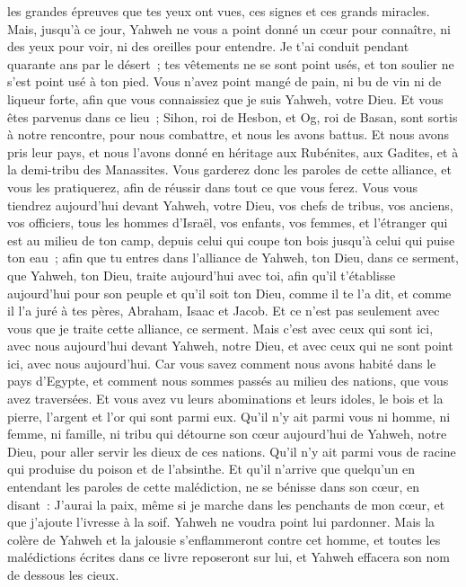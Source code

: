 \begin{multicols}{2}
les grandes épreuves que tes yeux ont vues, ces signes et ces grands miracles.
Mais, jusqu'à ce jour, Yahweh ne vous a point donné un cœur pour connaître, ni des yeux pour voir, ni des oreilles pour entendre.
Je t'ai conduit pendant quarante ans par le désert~; tes vêtements ne se sont point usés, et ton soulier ne s'est point usé à ton pied.
Vous n'avez point mangé de pain, ni bu de vin ni de liqueur forte, afin que vous connaissiez que je suis Yahweh, votre Dieu.
Et vous êtes parvenus dans ce lieu~; Sihon, roi de Hesbon, et Og, roi de Basan, sont sortis à notre rencontre, pour nous combattre, et nous les avons battus.
Et nous avons pris leur pays, et nous l'avons donné en héritage aux Rubénites, aux Gadites, et à la demi-tribu des Manassites.
Vous garderez donc les paroles de cette alliance, et vous les pratiquerez, afin de réussir dans tout ce que vous ferez.
Vous vous tiendrez aujourd'hui devant Yahweh, votre Dieu, vos chefs de tribus, vos anciens, vos officiers, tous les hommes d'Israël,
vos enfants, vos femmes, et l'étranger qui est au milieu de ton camp, depuis celui qui coupe ton bois jusqu'à celui qui puise ton eau~;
afin que tu entres dans l'alliance de Yahweh, ton Dieu, dans ce serment, que Yahweh, ton Dieu, traite aujourd'hui avec toi,
afin qu'il t'établisse aujourd'hui pour son peuple et qu'il soit ton Dieu, comme il te l'a dit, et comme il l'a juré à tes pères, Abraham, Isaac et Jacob.
Et ce n'est pas seulement avec vous que je traite cette alliance, ce serment.
Mais c'est avec ceux qui sont ici, avec nous aujourd'hui devant Yahweh, notre Dieu, et avec ceux qui ne sont point ici, avec nous aujourd'hui.
Car vous savez comment nous avons habité dans le pays d'Egypte, et comment nous sommes passés au milieu des nations, que vous avez traversées.
Et vous avez vu leurs abominations et leurs idoles, le bois et la pierre, l'argent et l'or qui sont parmi eux.
Qu'il n'y ait parmi vous ni homme, ni femme, ni famille, ni tribu qui détourne son cœur aujourd'hui de Yahweh, notre Dieu, pour aller servir les dieux de ces nations. Qu'il n'y ait parmi vous de racine qui produise du poison et de l'absinthe.
Et qu'il n'arrive que quelqu'un en entendant les paroles de cette malédiction, ne se bénisse dans son cœur, en disant~: J'aurai la paix, même si je marche dans les penchants de mon cœur, et que j'ajoute l'ivresse à la soif.
Yahweh ne voudra point lui pardonner. Mais la colère de Yahweh et la jalousie s'enflammeront contre cet homme, et toutes les malédictions écrites dans ce livre reposeront sur lui, et Yahweh effacera son nom de dessous les cieux.

\end{multicols}

